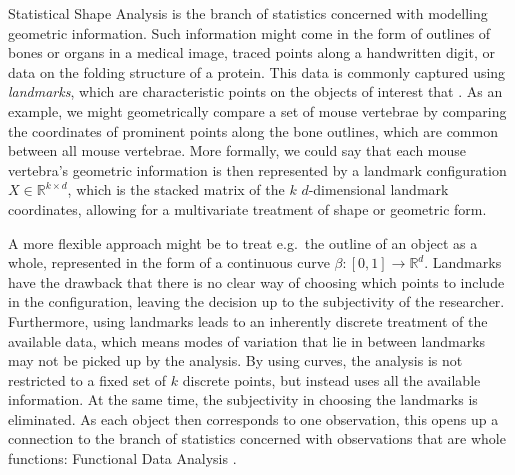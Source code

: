 \label{sec:1}
Statistical Shape Analysis \parencite[see e.g.][]{DrydenMardia2016} is the branch of statistics concerned with modelling geometric information.
Such information might come in the form of outlines of bones or organs in a medical image, traced points along a handwritten digit, or data on the folding structure of a protein.
This data is commonly captured using \emph{landmarks}, which are characteristic points on the objects of interest that .
As an example, we might geometrically compare a set of mouse vertebrae by comparing the coordinates of prominent points along the bone outlines, which are common between all mouse vertebrae.
More formally, we could say that each mouse vertebra's geometric information is then represented by a landmark configuration $X \in \mathbb{R}^{k \times d}$, which is the stacked matrix of the $k$ $d$-dimensional landmark coordinates, allowing for a multivariate treatment of shape or geometric form.

A more flexible approach might be to treat e.g.\ the outline of an object as a whole, represented in the form of a continuous curve $\beta : [0,1] \rightarrow \mathbb{R}^d$. 
Landmarks have the drawback that there is no clear way of choosing which points to include in the configuration, leaving the decision up to the subjectivity of the researcher. 
Furthermore, using landmarks leads to an inherently discrete treatment of the available data, which means modes of variation that lie in between landmarks may not be picked up by the analysis.  
By using curves, the analysis is not restricted to a fixed set of $k$ discrete points, but instead uses all the available information.
At the same time, the subjectivity in choosing the landmarks is eliminated.
As each object then corresponds to one observation, this opens up a connection to the branch of statistics concerned with observations that are whole functions: Functional Data Analysis \parencite[see e.g.][]{RamsaySilverman2005,WangChiouMueller2016}.

